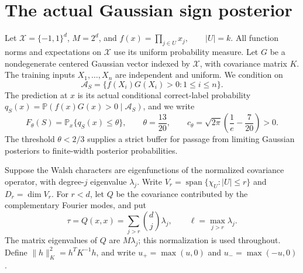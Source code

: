 
\section{The actual Gaussian sign posterior}
Let $\mathcal X=\{-1,1\}^d$, $M=2^d$, and
$f(x)=\prod_{j\in U}x_j, \qquad |U|=k$. All function norms and expectations on
$\mathcal X$ use its uniform probability measure. Let $G$ be a
nondegenerate centered Gaussian vector indexed by $\mathcal X$, with
covariance matrix $K$. The training inputs $X_1,\ldots,X_n$ are independent
and uniform. We condition on
\[
 \mathcal A_S=\{f(X_i)G(X_i)>0:1\le i\le n\}.
\]
The prediction at $x$ is its actual conditional correct-label probability
$q_S(x)=\mathbb P(f(x)G(x)>0\mid\mathcal A_S)$, and we write
\[
 F_\theta(S)=\mathbb P_x\{q_S(x)\le\theta\},\qquad
 \theta=\frac{13}{20},\qquad
 c_\theta=\sqrt{2\pi}\left(\frac1e-\frac7{20}\right)>0.
\]
The threshold $\theta<2/3$ supplies a strict buffer for passage from
limiting Gaussian posteriors to finite-width posterior probabilities.

Suppose the Walsh characters are eigenfunctions of the normalized
covariance operator, with degree-$j$ eigenvalue $\lambda_j$. Write
$V_r=\operatorname{span}\{\chi_U:|U|\le r\}$ and $D_r=\dim V_r$.
For $r<d$, let $Q$ be the covariance contributed by the complementary
Fourier modes, and put
\[
 \tau=Q(x,x)=\sum_{j>r}\binom dj\lambda_j,
 \qquad \ell=\max_{j>r}\lambda_j.
\]
The matrix eigenvalues of $Q$ are $M\lambda_j$; this normalization is
used throughout. Define $\|h\|_K^2=h^TK^{-1}h$, and write $u_+=\max(u,0)$ and $u_-=\max(-u,0)$.

